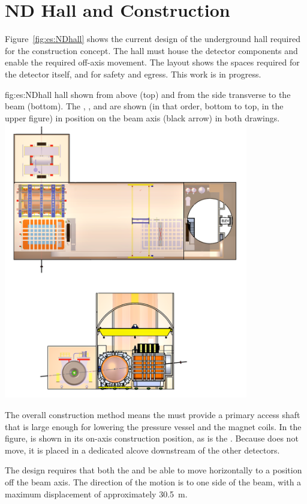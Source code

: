 \section{ND Hall and Construction}
\label{sec:exsum-nd-hall}
%

Figure~\ref{fig:es:NDhall} shows the current design of the underground hall required for the   construction concept. The hall must house the detector components and enable the required off-axis movement. The layout shows the spaces required for the detector itself, and for safety and egress.  This  work is in progress. 


\begin{dunefigure}{fig:es:NDhall}
{   hall shown from above (top) and from the side transverse to the beam (bottom). The , , and   are shown (in that order, bottom to top, in the upper figure) in position on the beam axis (black arrow) in both drawings. }
\includegraphics[width=0.8\textwidth]{graphics/nd-cavern-layout-no-dim}
\end{dunefigure}

The overall construction method means the  must %
provide a primary access shaft that is large enough for lowering the pressure vessel and the magnet coils. In the figure,  is shown in its on-axis construction position, %
as is the . %
Because   does not  move, it is placed in a dedicated alcove downstream of the other  detectors.

The  design requires that both the  and  be able to  move horizontally to a position off the beam axis. The direction of the motion is to one side of the beam, with a maximum displacement of approximately \SI{30.5}{m}. 